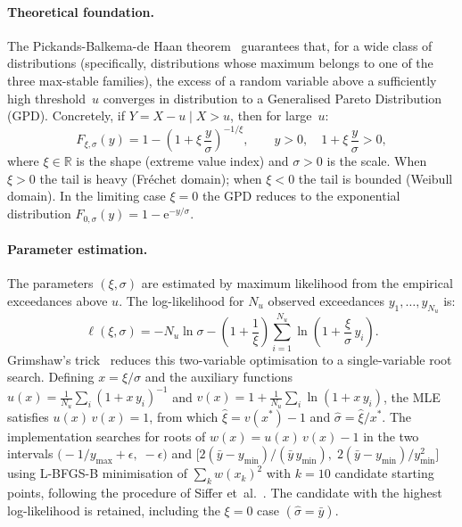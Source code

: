 \documentclass[11pt]{report}
\begin{document}
\paragraph{Theoretical foundation.}
The Pickands-Balkema-de Haan theorem~\cite{balkema1974residual,pickands1975statistical} guarantees that, for a wide class of distributions (specifically, distributions whose maximum belongs to one of the three max-stable families), the excess of a random variable above a sufficiently high threshold~$u$ converges in distribution to a Generalised Pareto Distribution (GPD). Concretely, if $Y = X - u \mid X > u$, then for large~$u$:
\begin{equation}
  \label{eq:gpd}
  F_{\xi,\sigma}(y) = 1 - \left(1 + \xi\,\frac{y}{\sigma}\right)^{-1/\xi}, \qquad y > 0, \quad 1 + \xi\,\frac{y}{\sigma} > 0,
\end{equation}
where $\xi \in \mathbb{R}$ is the shape (extreme value index) and $\sigma > 0$ is the scale. When $\xi > 0$ the tail is heavy (Fr\'{e}chet domain); when $\xi < 0$ the tail is bounded (Weibull domain). In the limiting case $\xi = 0$ the GPD reduces to the exponential distribution $F_{0,\sigma}(y) = 1 - \mathrm{e}^{-y/\sigma}$.

\paragraph{Parameter estimation.}
The parameters $(\xi, \sigma)$ are estimated by maximum likelihood from the empirical exceedances above $u$. The log-likelihood for $N_u$ observed exceedances $y_1, \ldots, y_{N_u}$ is:
\begin{equation}
  \label{eq:gpd_loglik}
  \ell(\xi, \sigma) = -N_u \ln \sigma - \left(1 + \frac{1}{\xi}\right)\sum_{i=1}^{N_u} \ln\!\left(1 + \frac{\xi}{\sigma}\,y_i\right).
\end{equation}
Grimshaw's trick~\cite{siffer:hal-01640325} reduces this two-variable optimisation to a single-variable root search. Defining $x = \xi / \sigma$ and the auxiliary functions $u(x) = \frac{1}{N_u}\sum_i (1 + x\,y_i)^{-1}$ and $v(x) = 1 + \frac{1}{N_u}\sum_i \ln(1 + x\,y_i)$, the MLE satisfies $u(x)\,v(x) = 1$, from which $\hat{\xi} = v(x^*) - 1$ and $\hat{\sigma} = \hat{\xi} / x^*$. The implementation searches for roots of $w(x) = u(x)\,v(x) - 1$ in the two intervals $\bigl(-1/y_{\max} + \epsilon,\; -\epsilon\bigr)$ and $\bigl[2(\bar{y} - y_{\min})/(\bar{y}\,y_{\min}),\; 2(\bar{y} - y_{\min})/y_{\min}^2\bigr]$ using L-BFGS-B minimisation of $\sum_k w(x_k)^2$ with $k = 10$ candidate starting points, following the procedure of Siffer et~al.~\cite{siffer:hal-01640325}. The candidate with the highest log-likelihood is retained, including the $\xi = 0$ case $(\hat{\sigma} = \bar{y})$.
\end{document}
